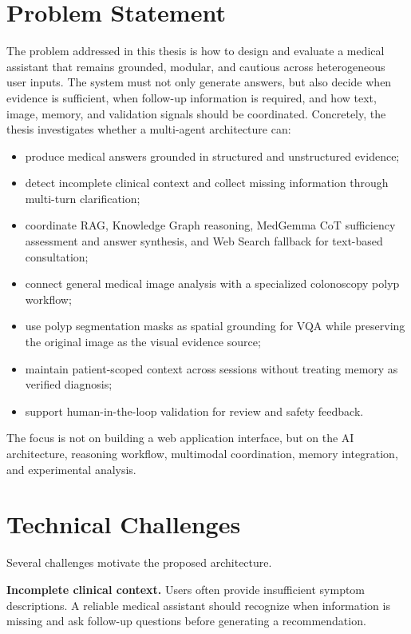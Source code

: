 \section{Problem Statement}

The problem addressed in this thesis is how to design and evaluate a medical assistant that remains grounded, modular, and cautious across heterogeneous user inputs. The system must not only generate answers, but also decide when evidence is sufficient, when follow-up information is required, and how text, image, memory, and validation signals should be coordinated. Concretely, the thesis investigates whether a multi-agent architecture can:

\begin{itemize}
    \item produce medical answers grounded in structured and unstructured evidence;
    \item detect incomplete clinical context and collect missing information through multi-turn clarification;
    \item coordinate RAG, Knowledge Graph reasoning, MedGemma CoT sufficiency assessment and answer synthesis, and Web Search fallback for text-based consultation;
    \item connect general medical image analysis with a specialized colonoscopy polyp workflow;
    \item use polyp segmentation masks as spatial grounding for VQA while preserving the original image as the visual evidence source;
    \item maintain patient-scoped context across sessions without treating memory as verified diagnosis;
    \item support human-in-the-loop validation for review and safety feedback.
\end{itemize}

The focus is not on building a web application interface, but on the AI architecture, reasoning workflow, multimodal coordination, memory integration, and experimental analysis.

\section{Technical Challenges}

Several challenges motivate the proposed architecture.

\textbf{Incomplete clinical context.} Users often provide insufficient symptom descriptions. A reliable medical assistant should recognize when information is missing and ask follow-up questions before generating a recommendation.

